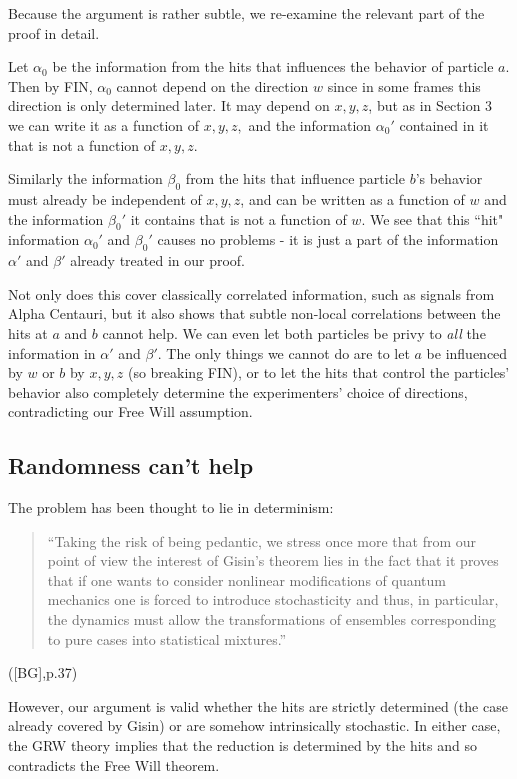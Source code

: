 \documentclass[12pt]{amsart}
\begin{document}
Because the argument is rather subtle, we re-examine the relevant part of the proof
in detail.
  
Let $\alpha_0$ be the information from the hits that influences the behavior 
of particle $a$.  Then by FIN, $\alpha_0$ cannot depend on the direction $w$ since
in some frames this direction is only determined later.  It may depend on $x,y,z$, but as in Section 3 we can write it as a function of $x,y,z,$ and the information $\alpha_0'$
contained in it that is not a function of $x,y,z.$  

Similarly the information $\beta_0$ from the hits that influence particle $b$'s
behavior must already be independent of $x,y,z$, and can be written as a function
of $w$ and the information $\beta_0'$ it contains that is not a function of $w$.
We see that this ``hit" information $\alpha_0'$ and $\beta_0'$ causes no
problems - it is just a part of the information $\alpha'$ and $\beta'$ 
already treated in our proof.
  
Not only does this cover classically correlated information, such as signals from
Alpha Centauri, but it also shows that subtle non-local correlations between the hits 
at $a$ and $b$ cannot help.  We can even let both particles be privy to {\em all} 
the information in $\alpha'$ and $\beta'$.  The only things we cannot do
are to let $a$ be influenced by $w$ or $b$ by $x,y,z$ (so breaking FIN), or to let 
the hits that control the particles' behavior also completely determine the experimenters'
choice of directions, contradicting our Free Will assumption.

\subsection {Randomness can't help}

The problem has been thought to lie in determinism:
\begin{quote}
\small
    ``Taking the risk of being pedantic, we stress once more that from 
     our point of view the interest of Gisin's theorem lies in the fact 
     that it proves that if one wants to consider nonlinear modifications
     of quantum mechanics one is forced to introduce stochasticity and
     thus, in particular, the dynamics must allow the transformations of
     ensembles corresponding to pure cases into statistical mixtures.''
\end{quote}
\normalsize
([BG],p.37)

However, our argument is valid whether the hits are strictly 
determined (the case already covered by Gisin) 
or are somehow intrinsically stochastic. 
In either case, the GRW theory implies that the reduction is 
determined by the hits and so contradicts the Free Will theorem.
\end{document}
